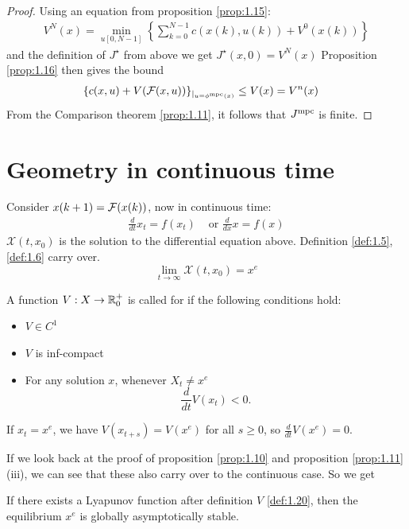\begin{proof}
    Using an equation from proposition \ref{prop:1.15}:
    \begin{align*}
        V^N(x)=\min_{u[0,N-1]}\left\{\sum_{k=0}^{N-1}c(x(k),u(k))+V^0(x(k))\right\}
    \end{align*}
    and the definition of \(J^\star\) from above we get \(J^\star(x,0)=V^N(x)\) 
    Proposition \ref{prop:1.16} then gives the bound
    \begin{align*}
        \{c(x,u)+V(\mathcal{F}(x,u))\}_{|_{u=\phi{^{\text{mpc}}}(x)}}&\leq V(x)=V^n(x)        
    \end{align*}
    From the Comparison theorem \ref{prop:1.11}, it follows that \(J{^{\text{mpc}}}\) is finite.
\end{proof}

\section{Geometry in continuous time}

Consider \(x(k+1)=\mathcal{F}(x(k))\), now in continuous time:
\begin{align*}
    \frac{d}{dt}x_t=f(x_t) & \text{ or } \frac{d}{dx} x=f(x)
\end{align*}
\(\mathcal{X}(t,x_0)\) is the solution to the differential equation above.
Definition \ref{def:1.5}, \ref{def:1.6} carry over.
\[\lim_{t\to\infty} \mathcal{X}(t,x_0)=x^e\]
\begin{definition}\label{def:1.20}
    A function \(V:X\to\mathbb{R}_0^+\) is called  for 
     if the following  conditions hold:
    \begin{itemize}
        \item[(i)] \(V\in C^1\)
        \item[(ii)] \(V\) is inf-compact
        \item[(iii)] For any solution \(x\), whenever \(X_t\neq x^e\) \[\frac{d}{dt}V(x_t)<0.\]   
    \end{itemize}
\end{definition}

If \(x_t=x^e\), we have \(V(x_{t+s})=V(x^e)\) for all \(s\geq 0\), so 
\(\frac{d}{dt}V(x^e)=0\).

If we look back at the proof of proposition \ref{prop:1.10} and proposition \ref{prop:1.11} (iii),
we can see that these also carry over to the continuous case. So we get 
\begin{proposition}\label{prop:1.21}
    If there exists a Lyapunov function after definition \(V\) \ref{def:1.20},
    then the equilibrium \(x^e\) is globally asymptotically stable.  
\end{proposition}  

